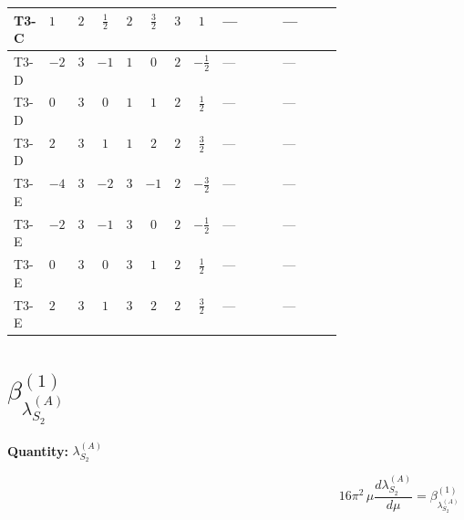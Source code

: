 \documentclass[8pt]{article}
\begin{document}
\begin{landscape}
\begin{longtable}{@{}llcccccc >{\raggedright\arraybackslash}p{0.21\linewidth} >{\raggedright\arraybackslash}p{0.21\linewidth}@{}}
\midrule
T3-C & $1$ & $2$ & $\frac{1}{2}$ & $2$ & $\frac{3}{2}$ & $3$ & $1$ & --- & --- \\
\midrule
T3-D & $-2$ & $3$ & $-1$ & $1$ & $0$ & $2$ & $-\frac{1}{2}$ & --- & --- \\
\midrule
T3-D & $0$ & $3$ & $0$ & $1$ & $1$ & $2$ & $\frac{1}{2}$ & --- & --- \\
\midrule
T3-D & $2$ & $3$ & $1$ & $1$ & $2$ & $2$ & $\frac{3}{2}$ & --- & --- \\
\midrule
T3-E & $-4$ & $3$ & $-2$ & $3$ & $-1$ & $2$ & $-\frac{3}{2}$ & --- & --- \\
\midrule
T3-E & $-2$ & $3$ & $-1$ & $3$ & $0$ & $2$ & $-\frac{1}{2}$ & --- & --- \\
\midrule
T3-E & $0$ & $3$ & $0$ & $3$ & $1$ & $2$ & $\frac{1}{2}$ & --- & --- \\
\midrule
T3-E & $2$ & $3$ & $1$ & $3$ & $2$ & $2$ & $\frac{3}{2}$ & --- & --- \\
\midrule
\bottomrule
\end{longtable}
\clearpage
\section*{$\beta_{\lambda_{S_2}^{(A)}}^{(1)}$}
\noindent\textbf{Quantity: }$\lambda_{S_2}^{(A)}$\par\smallskip
\[16\pi^2\,\mu\frac{d \lambda_{S_2}^{(A)}}{d\mu}=\beta_{\lambda_{S_2}^{(A)}}^{(1)}\]

\end{landscape}
\end{document}
